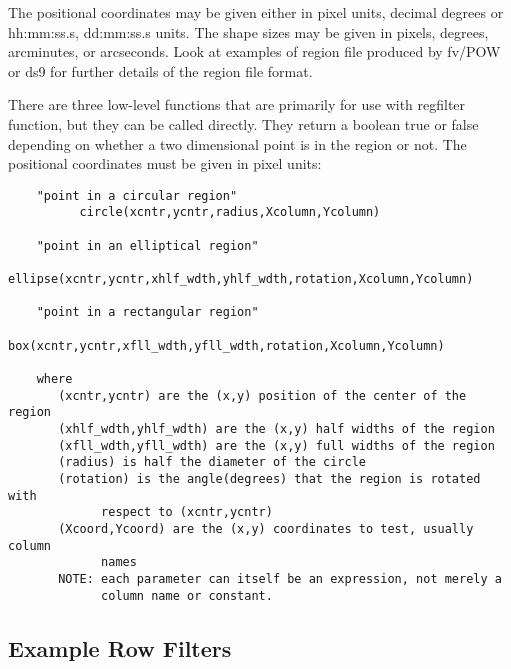 \documentclass[11pt]{book}
\begin{document}
    The positional coordinates may be given either in pixel units,
    decimal degrees or hh:mm:ss.s, dd:mm:ss.s units.  The shape sizes
    may be given in pixels, degrees, arcminutes, or arcseconds.  Look
    at examples of region file produced by fv/POW or ds9 for further
    details of the region file format.

    There are three low-level  functions that are primarily for use with
    regfilter function, but they  can  be  called  directly.  They
    return  a  boolean true   or  false  depending   on  whether a   two
    dimensional point is in the region or not.  The positional coordinates
    must be given in pixel units:

\begin{verbatim}
    "point in a circular region"
          circle(xcntr,ycntr,radius,Xcolumn,Ycolumn)

    "point in an elliptical region"
         ellipse(xcntr,ycntr,xhlf_wdth,yhlf_wdth,rotation,Xcolumn,Ycolumn)

    "point in a rectangular region"
             box(xcntr,ycntr,xfll_wdth,yfll_wdth,rotation,Xcolumn,Ycolumn)

    where
       (xcntr,ycntr) are the (x,y) position of the center of the region
       (xhlf_wdth,yhlf_wdth) are the (x,y) half widths of the region
       (xfll_wdth,yfll_wdth) are the (x,y) full widths of the region
       (radius) is half the diameter of the circle
       (rotation) is the angle(degrees) that the region is rotated with
             respect to (xcntr,ycntr)
       (Xcoord,Ycoord) are the (x,y) coordinates to test, usually column
             names
       NOTE: each parameter can itself be an expression, not merely a
             column name or constant.
\end{verbatim}


\subsection{Example Row Filters}
\end{document}
